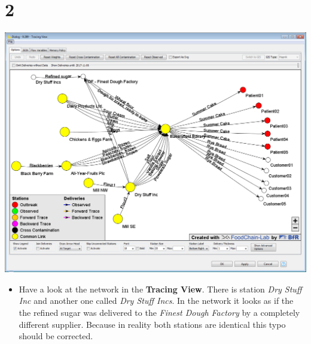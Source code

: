 \documentclass[10pt]{beamer}
\begin{document}
\section{2}
\begin{frame}
	\begin{center}
			\includegraphics[height=0.6\textheight]{2.png}
	\end{center}
	\begin{itemize}
		\item Have a look at the network in the \textbf{Tracing View}. There is station \textit{Dry Stuff Inc} and another one called \textit{Dry Stuff Incs}. In the network it looks as if the the refined sugar was delivered to the \textit{Finest Dough Factory} by a completely different supplier. Because in reality both stations are identical this typo should be corrected.
	\end{itemize}
\end{frame}
\end{document}
